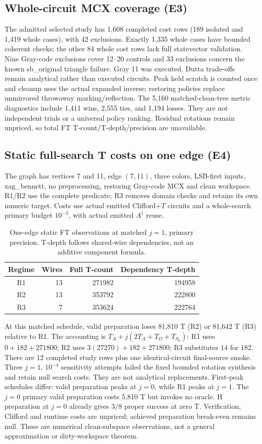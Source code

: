 \subsection{Whole-circuit MCX coverage (E3)}
The admitted selected study has 1,608 completed cost rows (189 isolated and
1,419 whole cases), with 42 exclusions. Exactly 1,335 whole cases have bounded
coherent checks; the other 84 whole cost rows lack full statevector validation.
Nine Gray-code exclusions cover 12--20 controls and 33 exclusions concern the
known sb\_original triangle failure. Gray 11 was executed. Dutta trade-offs
remain analytical rather than executed circuits. Peak held scratch is counted
once and cleanup uses the actual expanded inverse; restoring policies replace
unmirrored throwaway marking/reflection. The 5,160 matched-clean-tree metric
diagnostics include 1,411 wins, 2,555 ties, and 1,194 losses. They are not
independent trials or a universal policy ranking. Residual rotations remain
unpriced, so total FT T-count/T-depth/precision are unavailable.

\subsection{Static full-search T costs on one edge (E4)}
The graph has vertices 7 and 11, edge $(7,11)$, three colors, LSB-first inputs,
xag\_bennett, no preprocessing, restoring Gray-code MCX and clean workspace.
R1/R2 use the complete predicate; R3 removes domain checks and retains its
own numeric target. Costs use actual emitted Clifford+$T$ circuits and a
whole-search primary budget $10^{-3}$, with actual emitted $A^\dagger$ reuse.
\begin{table}[t]
\caption{One-edge static FT observations at matched $j=1$, primary precision.
T-depth follows shared-wire dependencies, not an additive component formula.}
\label{tab:bounded-ft}\centering\small
\begin{tabular}{crrr}\toprule
Regime & Wires & Full T-count & Dependency T-depth\\\midrule
R1 & 13 & 271982 & 194958\\
R2 & 13 & 353792 & 222800\\
R3 & 7 & 353624 & 222764\\\bottomrule
\end{tabular}
\end{table}
At this matched schedule, valid preparation loses 81,810 T (R2) or 81,642 T
(R3) relative to R1. The accounting is
$T_A+j(2T_A+T_O+T_{S_0})$: R1 uses $0+182+271800$;
R2 uses $3(27270)+182+271800$; R3 substitutes $14$ for $182$.
There are 12 completed study rows plus one identical-circuit final-source smoke.
Three $j=1$, $10^{-4}$ sensitivity attempts failed the fixed bounded rotation
synthesis and retain null search costs. They are not analytical replacements.
First-peak schedules differ: valid preparation peaks at $j=0$, while R1 peaks
at $j=1$. The $j=0$ primary valid preparation costs 5,810 T but invokes no
oracle. H preparation at $j=0$ already gives $3/8$ proper success at zero T.
Verification, Clifford and runtime costs are unpriced; achieved preparation
break-even remains null. These are numerical clean-subspace observations,
not a general approximation or dirty-workspace theorem.

